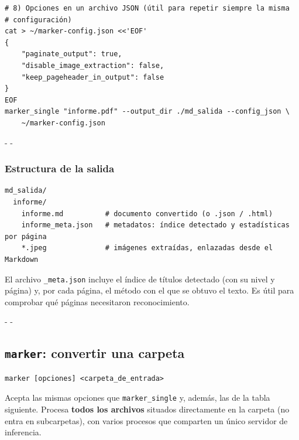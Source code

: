 \documentclass[11pt,a4paper]{article}
\makeatletter
\newcommand{\necesitaespacio}[1]{\par\penalty-100\begingroup
	\setlength{\dimen@}{#1}\dimen@ii\pagegoal\advance\dimen@ii-\pagetotal
	\ifdim\dimen@>\dimen@ii\ifdim\dimen@ii>\z@\vfil\fi\penalty-\@M\fi\endgroup}
\newcommand{\cmd}[1]{\texttt{\textcolor{colcmd}{#1}}}      %
\newcommand{\arch}[1]{\texttt{\textcolor{colarch}{#1}}}    %
\makeatother
\begin{document}
	\begin{lstlisting}
# 8) Opciones en un archivo JSON (útil para repetir siempre la misma
# configuración)
cat > ~/marker-config.json <<'EOF'
{
    "paginate_output": true,
    "disable_image_extraction": false,
    "keep_pageheader_in_output": false
}
EOF
marker_single "informe.pdf" --output_dir ./md_salida --config_json \
    ~/marker-config.json
\end{lstlisting}
	
	\necesitaespacio{6\baselineskip}
	\subsubsection{Estructura de la salida}
	
	\begin{lstlisting}[style=salida]
md_salida/
  informe/
    informe.md          # documento convertido (o .json / .html)
    informe_meta.json   # metadatos: índice detectado y estadísticas por página
    *.jpeg              # imágenes extraídas, enlazadas desde el Markdown
\end{lstlisting}
	
	El archivo \arch{\_meta.json} incluye el índice de títulos detectado (con su nivel y página) y, por cada página, el método con el que se obtuvo el texto. Es útil para comprobar qué páginas necesitaron reconocimiento.
	
	\necesitaespacio{8\baselineskip}
	\subsection{\texttt{marker}: convertir una carpeta}\label{sec:marker-lotes}
	
	\begin{lstlisting}[style=sintaxis]
marker [opciones] <carpeta_de_entrada>
\end{lstlisting}
	
	Acepta las mismas opciones que \cmd{marker\_single} y, además, las de la tabla siguiente. Procesa \textbf{todos los archivos} situados directamente en la carpeta (no entra en subcarpetas), con varios procesos que comparten un único servidor de inferencia.
	
\end{document}
